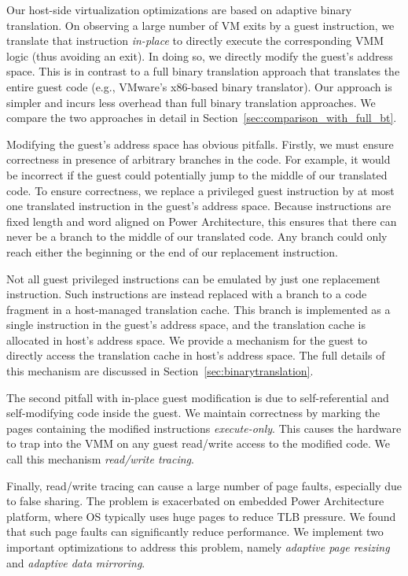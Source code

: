 \documentclass[10pt,twocolumn]{article}
\begin{document}
Our host-side virtualization optimizations are based on adaptive binary
translation. On observing a large number of VM exits by a guest instruction, we translate
that instruction {\em in-place} to directly execute the corresponding
VMM logic (thus avoiding an exit). In doing so, we directly modify the guest's
address space. This is in contrast to a full binary translation approach
that translates the entire guest code
(e.g., VMware's x86-based binary translator\cite{agesen:comparison}). Our approach is
simpler and incurs less overhead than full binary
translation approaches. We compare the two approaches in detail in
Section~\ref{sec:comparison_with_full_bt}.

Modifying the guest's address space has obvious pitfalls.
Firstly, we must ensure correctness in presence
of arbitrary branches in the code. For example, it would be incorrect if the guest
could potentially jump to the middle of our translated code.
To ensure correctness, we replace a privileged guest instruction
by at most one translated instruction in the guest's address space. Because instructions
are fixed length and word aligned on Power Architecture, this ensures that
there can never be a branch to the middle of our translated
code. Any branch could only reach either the beginning or the end of our
replacement instruction.

Not all guest privileged instructions can be emulated by just one
replacement instruction.
Such instructions are instead replaced with a branch to a code
fragment in a host-managed translation cache. This branch is implemented as a
single instruction in the guest's address space, and the translation
cache is allocated in host's address space. We provide a mechanism for the guest
to directly access the translation cache in host's address space. The full
details of this mechanism are discussed in Section~\ref{sec:binarytranslation}.

The second pitfall with in-place guest modification is due to
self-referential and self-modifying code inside the guest. We maintain correctness by 
marking the pages containing the modified instructions {\em execute-only}. This
causes the hardware to trap into the VMM on any guest read/write access to the
modified code. We call this mechanism {\em read/write tracing}.

Finally, read/write tracing can cause a large number of
page faults, especially due to false sharing. The problem is
exacerbated on embedded Power Architecture platform, where OS typically uses
huge pages to reduce TLB pressure. We found that such page faults can
significantly reduce performance.
We implement two important optimizations to address this problem, namely
{\em adaptive page resizing} and {\em adaptive data mirroring}.
\end{document}
